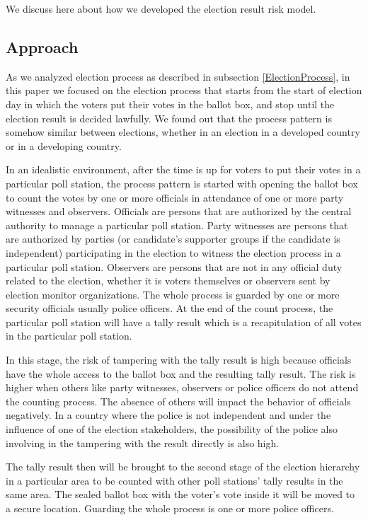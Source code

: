 \documentclass[JIP]{ipsj}
\begin{document}
We discuss here about how we developed the election result risk model.

\subsection{Approach}%

As we analyzed election process as described in subsection \ref{ElectionProcess}, in this paper we focused on the election process that starts from the start of election day in which the voters put their votes in the ballot box, and stop until the election result is decided lawfully. We found out that the process pattern is somehow similar between elections, whether in an election in a developed country or in a developing country.

In an idealistic environment, after the time is up for voters to put their votes in a particular poll station, the process pattern is started with opening the ballot box to count the votes by one or more officials in attendance of one or more party witnesses and observers. Officials are persons that are authorized by the central authority to manage a particular poll station. Party witnesses are persons that are authorized by parties (or candidate's supporter groups if the candidate is independent) participating in the election to witness the election process in a particular poll station. Observers are persons that are not in any official duty related to the election, whether it is voters themselves or observers sent by election monitor organizations. The whole process is guarded by one or more security officials usually police officers. At the end of the count process, the particular poll station will have a tally result which is a recapitulation of all votes in the particular poll station.

In this stage, the risk of tampering with the tally result is high because officials have the whole access to the ballot box and the resulting tally result. The risk is higher when others like party witnesses, observers or police officers do not attend the counting process. The absence of others will impact the behavior of officials negatively. In a country where the police is not independent and under the influence of one of the election stakeholders, the possibility of the police also involving in the tampering with the result directly is also high.

The tally result then will be brought to the second stage of the election hierarchy in a particular area to be counted with other poll stations' tally results in the same area. The sealed ballot box with the voter's vote inside it will be moved to a secure location. Guarding the whole process is one or more police officers.
\end{document}
